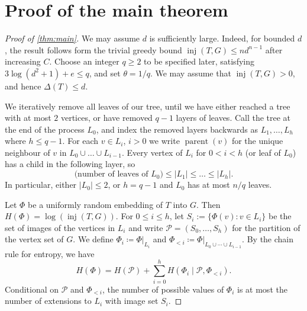 \documentclass[reqno,final,a4paper]{amsart}
\numberwithin{equation}{section}
\theoremstyle{definition}
\theoremstyle{remark}
\DeclareMathOperator{\parent}{parent}
\DeclareMathOperator{\inj}{inj}
\begin{document}
\section{Proof of the main theorem}\label{sec:proof}
\begin{proof}[Proof of \cref{thm:main}] We may assume $d$ is sufficiently large.
Indeed, for bounded $d$, the result follows form the trivial greedy bound $\inj(T,G)\leq nd^{n-1}$ after increasing $C$.
Choose an integer $q\geq 2$ to be specified later, satisfying $3\log(d^2+1)+e\le q$, and set $\theta = 1/q$. We may assume that $\inj(T,G)>0$, and hence $\Delta(T)\le d$.

We iteratively remove all leaves of our tree, until we have either reached a tree with at most $2$ vertices, or have removed $q-1$ layers of leaves. Call the tree at the end of the process $L_0$, and index the removed layers backwards as $L_1,\dots,L_h$ where $h\leq q-1$. For each $v\in L_i$, $i>0$ we write $\parent(v)$ for the unique neighbour of $v$ in $L_0\cup\dots \cup L_{i-1}$. Every vertex of $L_i$ for $0<i<h$ (or leaf of $L_0$) has a child in the following layer, so
$$\text{(number of leaves of $L_0$)}\leq |L_1|\leq \dots \leq |L_h|.$$
In particular, either $|L_0|\leq 2$, or $h=q-1$ and $L_0$ has at most $n/q$ leaves.

Let $\Phi$ be a uniformly random embedding of $T$ into $G$. Then $H(\Phi)=\log(\inj(T,G))$. For $0\leq i\leq h$, let $S_i:=\{\Phi(v):v\in L_i\}$ be the set of images of the vertices in $L_i$ and write $\mathcal{P}=(S_0,\dots , S_h)$ for the partition of the vertex set of $G$. We define $\Phi_i\coloneqq \Phi|_{L_i}$ and $\Phi_{<i}\coloneqq \Phi|_{L_0\cup\cdots\cup L_{i-1}}
$.
By the chain rule for entropy, we have
$$H(\Phi)=H(\mathcal{P})+\sum_{i=0}^{h}H(\Phi_i\mid\mathcal{P},\Phi_{<i}).$$
Conditional on $\mathcal P$ and $\Phi_{<i}$, the number of possible
values of $\Phi_i$ is at most the number of extensions to $L_i$
with image set $S_i$. 


\end{proof}
\end{document}
